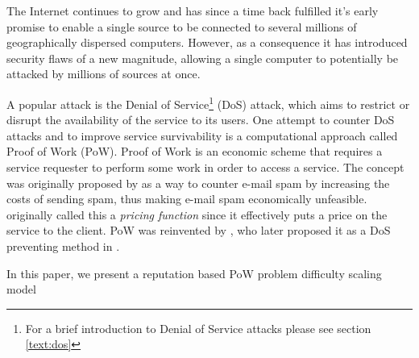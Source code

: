 The Internet continues to grow and has since a time back fulfilled it's early promise to enable a single source to be connected to several millions of geographically dispersed computers. However, as a consequence it has introduced security flaws of a new magnitude, allowing a single computer to potentially be attacked by millions of sources at once.

A popular attack is the Denial of Service\footnote{For a brief introduction to Denial of Service attacks please see section \ref{text:dos}} (DoS) attack, which aims to restrict or disrupt the availability of the service to its users.
One attempt to counter DoS attacks and to improve service survivability is a computational approach called Proof of Work (PoW).
Proof of Work is an economic scheme that requires a service requester to perform some work in order to access a service.
The concept was originally proposed by \citeauthor{DworkN92}\cite{DworkN92} as a way to counter e-mail spam by increasing the costs of sending spam, thus making e-mail spam economically unfeasible.
\citeauthor{DworkN92} originally called this a \emph{pricing function} since it effectively puts a price on the service to the client.
PoW was reinvented by \citeauthor{Back02}, who later proposed it as a DoS preventing method in . 

In this paper, we present a reputation based PoW problem difficulty scaling model

 




